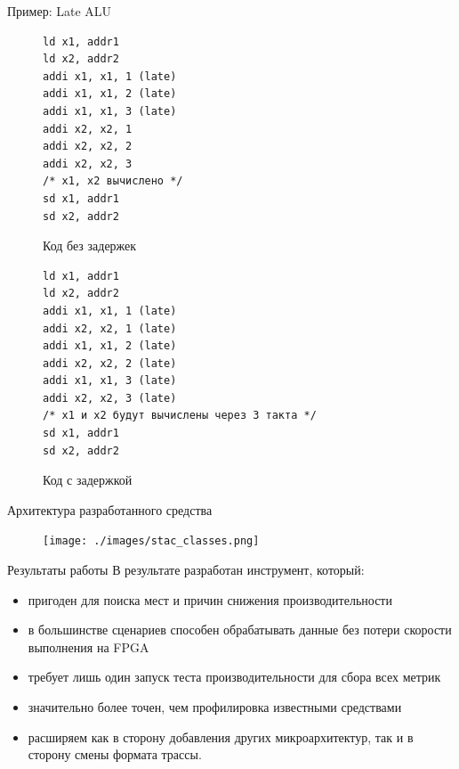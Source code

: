 \documentclass[10pt,aspectratio=169,hyperref={pdftex,unicode},xcolor=dvipsnames]{beamer}
\begin{document}
\begin{frame}[fragile]{ Пример: Late ALU }
\begin{minipage}[]{\linewidth}
    \begin{minipage}[]{0.5\linewidth}
    \begin{figure}[h]
        \centering
        \begin{verbatim}
ld x1, addr1
ld x2, addr2
addi x1, x1, 1 (late)
addi x1, x1, 2 (late)
addi x1, x1, 3 (late)
addi x2, x2, 1
addi x2, x2, 2
addi x2, x2, 3
/* x1, x2 вычислено */
sd x1, addr1
sd x2, addr2
        \end{verbatim}
        \label{lalu_good_code}
        \caption{Код без задержек}
    \end{figure}
    \end{minipage}
    \begin{minipage}[]{0.50\linewidth}
    \begin{figure}[h]
        \centering
        \begin{verbatim}
ld x1, addr1
ld x2, addr2
addi x1, x1, 1 (late)
addi x2, x2, 1 (late)
addi x1, x1, 2 (late)
addi x2, x2, 2 (late)
addi x1, x1, 3 (late)
addi x2, x2, 3 (late)
/* x1 и x2 будут вычислены через 3 такта */
sd x1, addr1
sd x2, addr2
        \end{verbatim}
        \label{lalu_bad_code}
        \caption{Код с задержкой}
    \end{figure}
    \end{minipage}
\end{minipage}
\end{frame}

\begin{frame}{ Архитектура разработанного средства }
    \begin{figure}
        \centering
        \texttt{[image: ./images/stac\_classes.png]}
    \end{figure}
\end{frame}

\begin{frame}{ Результаты работы }
    В результате разработан инструмент, который:
    \begin{itemize}
        \item
        пригоден для поиска мест и причин снижения производительности
        \pause \item
        в большинстве сценариев способен обрабатывать данные
        без потери скорости выполнения на FPGA
        \pause \item
        требует лишь один запуск теста производительности для
        сбора всех метрик
        \pause \item
        значительно более точен, чем профилировка известными
        средствами
        \pause \item
        расширяем как в сторону добавления других микроархитектур,
        так и в сторону смены формата трассы.
    \end{itemize}
\end{frame}
\end{document}
